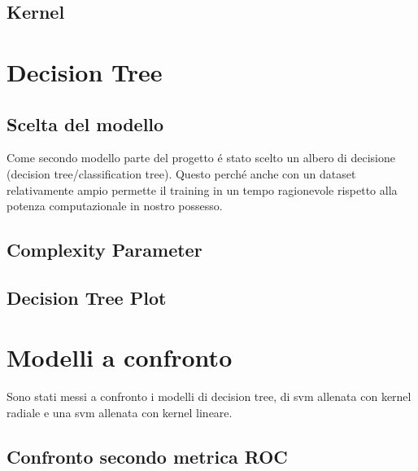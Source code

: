 \subsection{Kernel}

\section{Decision Tree} \subsection{Scelta del modello} Come secondo
modello parte del progetto é stato scelto un albero di decisione
(decision tree/classification tree). Questo perché anche con un
dataset relativamente ampio permette il training in un tempo
ragionevole rispetto alla potenza computazionale in nostro possesso.

\subsection{Complexity Parameter}
\subsection{Decision Tree Plot}

\section{Modelli a confronto}
Sono stati messi a confronto i modelli di decision tree, di svm
allenata con kernel radiale e una svm allenata con kernel lineare.

\subsection{Confronto secondo metrica ROC}

